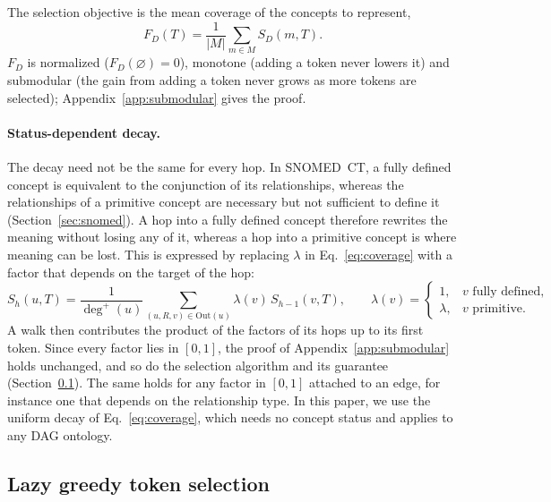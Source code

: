 The selection objective is the mean coverage of the concepts to represent,
\[
F_D(T) = \frac{1}{|M|} \sum_{m \in M} S_D(m, T).
\]
$F_D$ is normalized ($F_D(\varnothing) = 0$), monotone (adding a token never lowers it) and submodular (the gain from adding a token never grows as more tokens are selected); Appendix~\ref{app:submodular} gives the proof.

\paragraph{Status-dependent decay.}
The decay need not be the same for every hop.
In SNOMED~CT, a fully defined concept is equivalent to the conjunction of its relationships, whereas the relationships of a primitive concept are necessary but not sufficient to define it (Section~\ref{sec:snomed}).
A hop into a fully defined concept therefore rewrites the meaning without losing any of it, whereas a hop into a primitive concept is where meaning can be lost.
This is expressed by replacing $\lambda$ in Eq.~\eqref{eq:coverage} with a factor that depends on the target of the hop:
\begin{equation}
S_h(u, T) = \frac{1}{\deg^+(u)} \sum_{(u,R,v) \in \mathrm{Out}(u)} \lambda(v)\, S_{h-1}(v, T),
\qquad
\lambda(v) =
\begin{cases}
1, & v \text{ fully defined},\\
\lambda, & v \text{ primitive}.
\end{cases}
\label{eq:coverage-status}
\end{equation}
A walk then contributes the product of the factors of its hops up to its first token.
Since every factor lies in $[0, 1]$, the proof of Appendix~\ref{app:submodular} holds unchanged, and so do the selection algorithm and its guarantee (Section~\ref{sec:method:selection}).
The same holds for any factor in $[0, 1]$ attached to an edge, for instance one that depends on the relationship type.
In this paper, we use the uniform decay of Eq.~\eqref{eq:coverage}, which needs no concept status and applies to any DAG ontology.

\subsection{Lazy greedy token selection}
\label{sec:method:selection}


